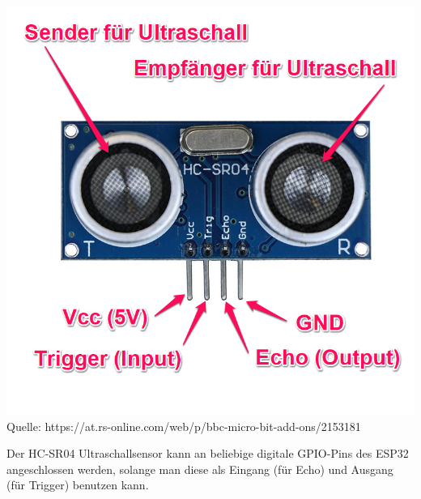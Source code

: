 \documentclass[ngerman,12pt,a4paper]{article}
\begin{document}
		\begin{center}
			\begin{minipage}{0.9\textwidth}
				\centering
				\includegraphics[width=\textwidth]{Pictures/ultraschall_sensor}
				\label{fig:ultraschall_sensor}
				\vspace{5pt}
				{\small Quelle: {https://at.rs-online.com/web/p/bbc-micro-bit-add-ons/2153181}}
			\end{minipage}
		\end{center}
		\newpage\noindent
		Der HC-SR04 Ultraschallsensor kann an beliebige digitale GPIO-Pins des ESP32 angeschlossen werden, solange man diese als Eingang (für Echo) und Ausgang (für Trigger) benutzen kann.
\end{document}
